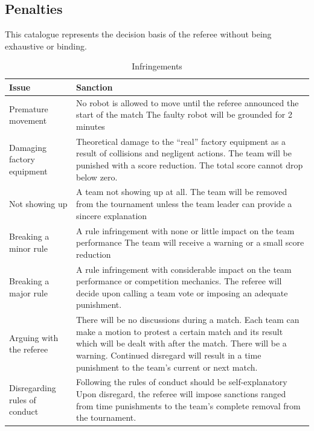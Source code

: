 \documentclass[12pt,twoside]{article}
\begin{document}
\subsection{Penalties}

This catalogue represents the decision basis of the referee without
being exhaustive or binding.

\begin{table}[h]
  \centering
  \begin{tabularx}{\linewidth}{l|X}
  \multicolumn{1}{l}{Issue} &\multicolumn{1}{l}{Sanction}\\\hline
  Premature movement & No robot is allowed to move until the referee
  announced the start of the match The faulty robot will be grounded
  for
  2 minutes\\
%
  Damaging factory equipment & Theoretical damage to the “real”
  factory equipment as a result of collisions and negligent actions.
  The team will be punished with a score reduction. The total score
  cannot  drop below zero.\\
%
  Not showing up & A team not showing up at all. The team will be
  removed from the tournament unless the team leader can provide a
  sincere explanation\\
%
  Breaking a minor rule & A rule infringement with none or little
  impact on the team performance The team will receive a warning or a
  small
  score reduction\\
%
  Breaking a major rule & A rule infringement with considerable impact
  on the team performance or competition mechanics. The referee will
  decide upon calling a team vote or imposing an adequate punishment.\\
%
  Arguing with the referee & There will be no discussions during a
  match. Each team can make a motion to protest a certain match and
  its result which will be dealt with after the match. There will be a
  warning. Continued disregard will result in a time punishment to the
  team’s current or next match.\\
%
  Disregarding rules of conduct & Following the rules of conduct
  should be self-explanatory Upon disregard, the referee will impose
  sanctions ranged from time punishments to the team’s complete
  removal from the tournament.\\\hline
  \end{tabularx}  
  \caption{Infringements}
  \label{tab:infringements}
\end{table}


\end{document}
